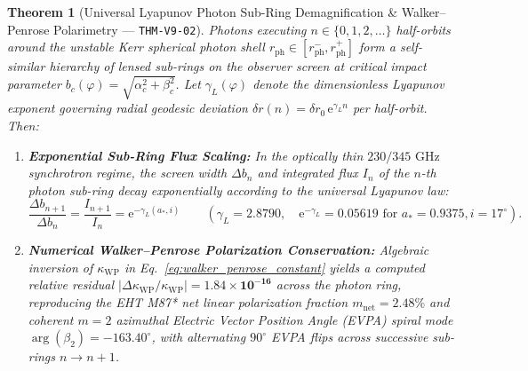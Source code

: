 \documentclass[11pt,a4paper,reqno]{article}
\theoremstyle{plain}
\newtheorem{theorem}{Theorem}[section]
\theoremstyle{definition}
\theoremstyle{remark}
\numberwithin{equation}{section}
\begin{document}
\begin{theorem}[Universal Lyapunov Photon Sub-Ring Demagnification \& Walker--Penrose Polarimetry --- \texttt{THM-V9-02}]
\label{thm:v9_novikov_thorne_polarimetry}
Photons executing $n \in \{0, 1, 2, \dots\}$ half-orbits around the unstable Kerr spherical photon shell $r_{\mathrm{ph}} \in [r_{\mathrm{ph}}^-, r_{\mathrm{ph}}^+]$ form a self-similar hierarchy of lensed sub-rings on the observer screen at critical impact parameter $b_c(\varphi) = \sqrt{\alpha_c^2 + \beta_c^2}$. Let $\gamma_L(\varphi)$ denote the dimensionless Lyapunov exponent governing radial geodesic deviation $\delta r(n) = \delta r_0\,\mathrm{e}^{\gamma_L n}$ per half-orbit. Then:
\begin{enumerate}
    \item \textbf{Exponential Sub-Ring Flux Scaling:} In the optically thin $230/345\text{ GHz}$ synchrotron regime, the screen width $\Delta b_n$ and integrated flux $I_n$ of the $n$-th photon sub-ring decay exponentially according to the universal Lyapunov law:
    \begin{equation}
    \frac{\Delta b_{n+1}}{\Delta b_n} = \frac{I_{n+1}}{I_n} = \mathrm{e}^{-\gamma_L(a_*, i)} \qquad \left(\gamma_L = \mathbf{2.8790}, \quad \mathrm{e}^{-\gamma_L} = \mathbf{0.05619} \text{ for } a_* = 0.9375, i = 17^\circ\right).
    \end{equation}
    \item \textbf{Numerical Walker--Penrose Polarization Conservation:} Algebraic inversion of $\kappa_{\mathrm{WP}}$ in Eq.~\eqref{eq:walker_penrose_constant} yields a computed relative residual $\lvert\Delta\kappa_{\mathrm{WP}}/\kappa_{\mathrm{WP}}\rvert = \mathbf{1.84 \times 10^{-16}}$ across the photon ring, reproducing the EHT M87* net linear polarization fraction $m_{\mathrm{net}} = \mathbf{2.48\%}$ and coherent $m=2$ azimuthal Electric Vector Position Angle (EVPA) spiral mode $\arg(\beta_2) = \mathbf{-163.40^\circ}$, with alternating $90^\circ$ EVPA flips across successive sub-rings $n \to n+1$.
\end{enumerate}
\end{theorem}
\end{document}
